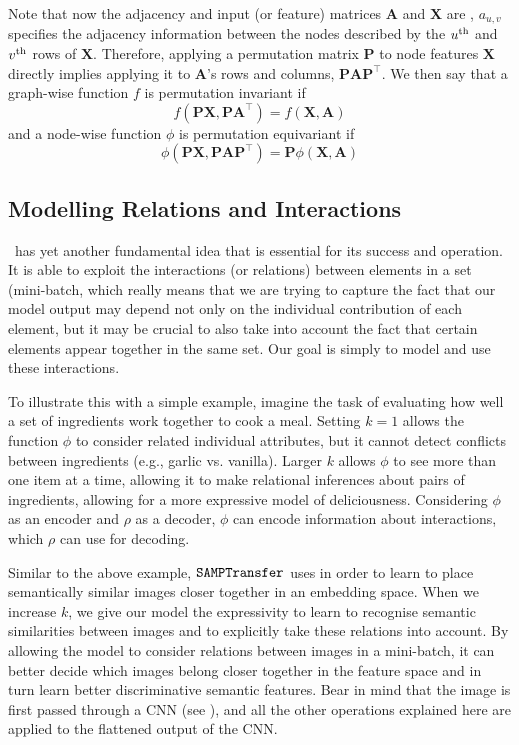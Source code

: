 Note that now the adjacency and input (or feature) matrices $\symbf{A}$ and $\symbf{X}$ are , $a_{u, v}$
specifies the adjacency information between the nodes described by the $u\textsuperscript{th}$ and $v\textsuperscript{th}$
rows of $\symbf{X}$. Therefore, applying a permutation matrix $\symbf{P}$ to node features $\symbf{X}$ directly implies applying it to $\symbf{A}$'s rows and columns, $\symbf{PA}\symbf{P}^\top$. We then say that a graph-wise function $f$ is permutation invariant if 
\begin{equation}
    f\left(\symbf{P X}, \symbf{P A}^{\top}\right)=f(\symbf{X}, \symbf{A})
\end{equation}
and a node-wise function $\phi$ is permutation equivariant if
\begin{equation}
    \phi\left(\symbf{P X}, \symbf{P A P}^{\top}\right)=\symbf{P}\phi(\symbf{X}, \symbf{A})
\end{equation}

\subsection{Modelling Relations and Interactions}\label{ssec:relation-and-interactions}

\samptr\ has yet another fundamental idea that is essential for its success and operation. 
It is able to exploit the interactions (or relations) between elements in a set (mini-batch, which really means that we are trying to capture the fact that our model output may depend not only on the individual contribution of each element, but it may be crucial to also take into account the fact that certain elements appear together in the same set. Our goal is simply to model and use these interactions.

To illustrate this with a simple example, imagine the task of evaluating how well a set of ingredients work together to cook a meal. Setting $k=1$ allows the function $\phi$ to consider related individual attributes, but it cannot detect conflicts between ingredients (e.g., garlic vs. vanilla). Larger $k$ allows $\phi$ to see more than one item at a time, allowing it to make relational inferences about pairs of ingredients, allowing for a more expressive model of deliciousness. Considering $\phi$ as an encoder and $\rho$ as a decoder, $\phi$ can encode information about interactions, which $\rho$ can use for decoding.

Similar to the above example, $\texttt{SAMPTransfer}$ uses  in order to learn to place semantically similar images closer together in an embedding space. When we increase $k$, we give our model the expressivity to learn to recognise semantic similarities between images and to explicitly take these relations into account. By allowing the model to consider relations between images in a mini-batch, it can better decide which images belong closer together in the feature space and in turn learn better discriminative semantic features. Bear in mind that the image is first passed through a CNN (see ), and all the other operations explained here are applied to the flattened output of the CNN.

